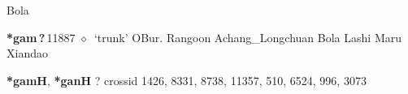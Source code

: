 \begin{list}{}{\leftmargin=1.5em \itemindent=-1.5em}
         Bola 
  \item {\footnotesize \textbf{*gam\,?\,}}{\tiny 11887}
\hspace{1ex}
         $\diamond$~`trunk'
         OBur. 
\hspace{1ex}
         Rangoon 
\hspace{1ex}
         Achang\_Longchuan 
\hspace{1ex}
         Bola 
\hspace{1ex}
         Lashi 
\hspace{1ex}
         Maru 
\hspace{1ex}
         Xiandao 
  \end{list}
\item
\textbf{*gamH}, \textbf{*ganH}
?
  {\tiny crossid 1426, 8331, 8738, 11357, 510, 6524, 996, 3073}
